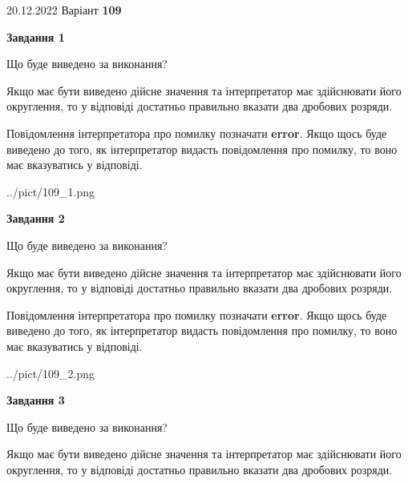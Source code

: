 \documentclass[12pt, ukrainian]{article}
\begin{document}
{20.12.2022 Варіант \No \textbf { 109 }\par}
{
\begin {Large}

{\begin {center}\textbf{Завдання 1}\end {center}}\par
Що буде виведено за виконання? \par

Якщо має бути виведено дійсне значення та інтерпретатор має здійснювати його округлення, 
то у відповіді достатньо правильно вказати два дробових розряди.

Повідомлення інтерпретатора про помилку позначати \textbf{error}.
Якщо щось буде виведено до того, як інтерпретатор видасть повідомлення про помилку, 
то воно має вказуватись у відповіді. \par

\begin{center}
	{../pict/109_1.png}
\end{center}
\newpage

{\begin {center}\textbf{Завдання 2}\end {center}}\par
Що буде виведено за виконання? \par

Якщо має бути виведено дійсне значення та інтерпретатор має здійснювати його округлення, 
то у відповіді достатньо правильно вказати два дробових розряди.

Повідомлення інтерпретатора про помилку позначати \textbf{error}.
Якщо щось буде виведено до того, як інтерпретатор видасть повідомлення про помилку, 
то воно має вказуватись у відповіді. \par

\begin{center}
	{../pict/109_2.png}
\end{center}
\newpage

{\begin {center}\textbf{Завдання 3}\end {center}}\par
Що буде виведено за виконання? \par

Якщо має бути виведено дійсне значення та інтерпретатор має здійснювати його округлення, 
то у відповіді достатньо правильно вказати два дробових розряди.


\end{Large}}
\end{document}
